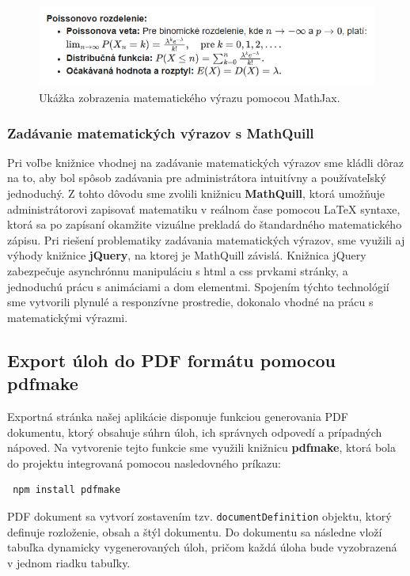   \begin{figure}[H]
    \centering
    \includegraphics[width=13cm]{img/mathjax_priklad.png}
    \caption{Ukážka zobrazenia matematického výrazu pomocou MathJax.}
    \label{fig:mathjax-priklad}
  \end{figure}

  \subsubsection{Zadávanie matematických výrazov s MathQuill}

 Pri voľbe knižnice vhodnej na zadávanie matematických výrazov sme kládli dôraz na to, aby bol spôsob zadávania pre administrátora intuitívny a používateľský jednoduchý.
 Z tohto dôvodu sme zvolili knižnicu \textbf{MathQuill}, ktorá umožňuje administrátorovi zapisovať matematiku v reálnom čase pomocou LaTeX syntaxe, ktorá sa po zapísaní okamžite vizuálne prekladá do štandardného matematického zápisu.
 Pri riešení problematiky zadávania matematických výrazov, sme využili aj výhody knižnice \textbf{jQuery}, na ktorej je MathQuill závislá.
 Knižnica jQuery zabezpečuje asynchrónnu manipuláciu s \acrshort{html} a \acrshort{css} prvkami stránky,  a jednoduchú prácu s animáciami a \acrshort{dom} elementmi.
 Spojením týchto technológií sme vytvorili plynulé a responzívne prostredie, dokonalo vhodné na prácu s matematickými výrazmi.

 \subsection{Export úloh do PDF formátu pomocou pdfmake}

 Exportná stránka našej aplikácie disponuje funkciou generovania PDF dokumentu, ktorý obsahuje súhrn úloh, ich správnych odpovedí a prípadných nápoved.
 Na vytvorenie tejto funkcie sme využili knižnicu \textbf{pdfmake}, ktorá bola do projektu integrovaná pomocou nasledovného príkazu:  
 \begin{verbatim} npm install pdfmake \end{verbatim}
 
PDF dokument sa vytvorí zostavením tzv. \texttt{documentDefinition} objektu, ktorý definuje rozloženie, obsah a štýl dokumentu.
 Do dokumentu sa následne vloží tabuľka dynamicky vygenerovaných úloh, pričom každá úloha bude vyzobrazená v jednom riadku tabuľky.
 
